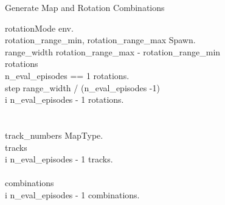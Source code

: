 \renewcommand{\thepseudonum}{\roman{pseudonum}}
\begin{pseudocode}{Generate Map and Rotation Combinations}{ }


rotationMode \GETS env.\\
rotation\_range\_min, rotation\_range\_max \GETS Spawn.\\

range\_width \GETS rotation\_range\_max - rotation\_range\_min\\
rotations \GETS []\\

\IF n\_eval\_episodes == 1 \THEN
    rotations.\\
\ELSE
\BEGIN
    step \GETS range\_width / (n\_eval\_episodes -1)\\
    \FOR i  \TO n\_eval\_episodes - 1 \DO
        \BEGIN
        rotations.\\
        \END\\
\END\\

track\_numbers \GETS MapType.\\
tracks \GETS []\\
\FOR i  \TO n\_eval\_episodes - 1 \DO
\BEGIN
tracks.\\
\END\\

combinations \GETS []\\
\FOR i  \TO n\_eval\_episodes - 1 \DO
\BEGIN
combinations.\\
\END\\

\ENDPROCEDURE
\label{fig:generate_track_rotation}
\end{pseudocode}





